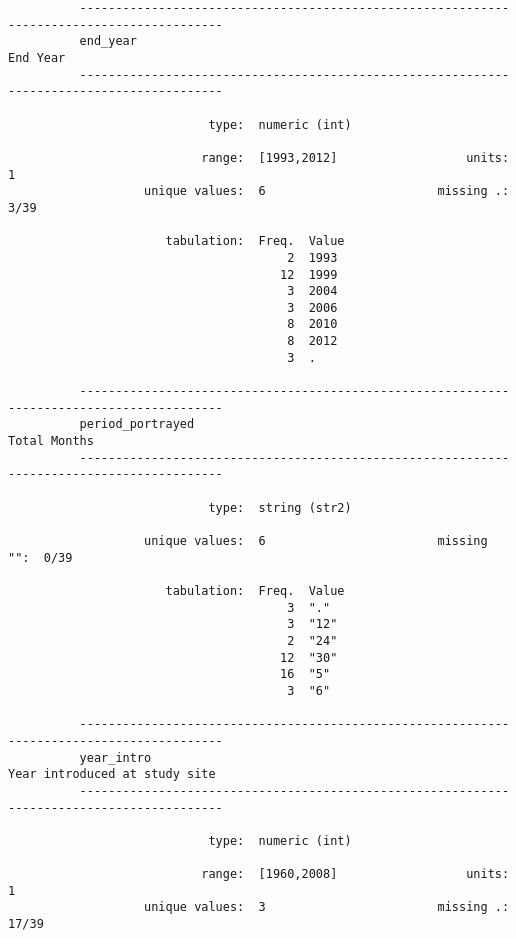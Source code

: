 \documentclass{article}
\begin{document}
\begin{verbatim}
          ------------------------------------------------------------------------------------------
          end_year                                                                          End Year
          ------------------------------------------------------------------------------------------
          
                            type:  numeric (int)
          
                           range:  [1993,2012]                  units:  1
                   unique values:  6                        missing .:  3/39
          
                      tabulation:  Freq.  Value
                                       2  1993
                                      12  1999
                                       3  2004
                                       3  2006
                                       8  2010
                                       8  2012
                                       3  .
          
          ------------------------------------------------------------------------------------------
          period_portrayed                                                              Total Months
          ------------------------------------------------------------------------------------------
          
                            type:  string (str2)
          
                   unique values:  6                        missing "":  0/39
          
                      tabulation:  Freq.  Value
                                       3  "."
                                       3  "12"
                                       2  "24"
                                      12  "30"
                                      16  "5"
                                       3  "6"
          
          ------------------------------------------------------------------------------------------
          year_intro                                                   Year introduced at study site
          ------------------------------------------------------------------------------------------
          
                            type:  numeric (int)
          
                           range:  [1960,2008]                  units:  1
                   unique values:  3                        missing .:  17/39
          

\end{verbatim}
\end{document}
